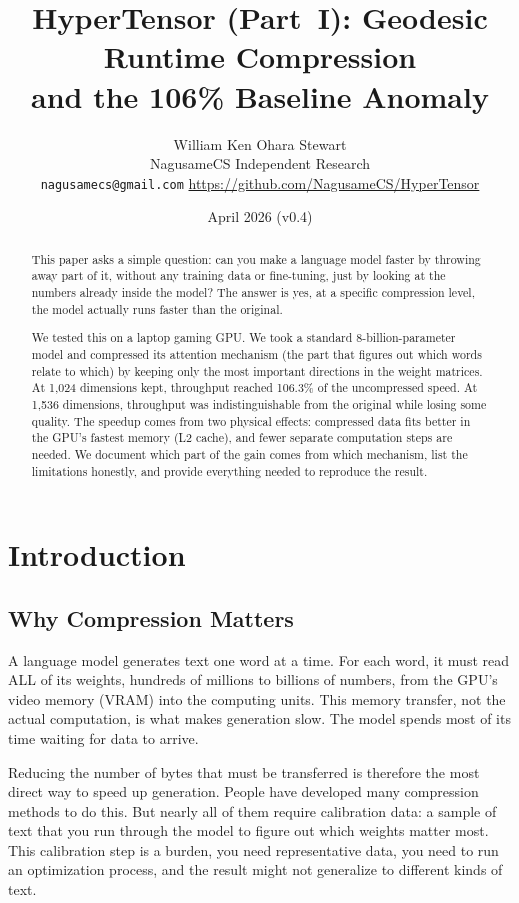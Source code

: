 \documentclass[11pt]{article}
\title{HyperTensor (Part~I): Geodesic Runtime Compression\\and the 106\% Baseline Anomaly}
\author{William Ken Ohara Stewart\\
\small NagusameCS Independent Research\\
\small \texttt{nagusamecs@gmail.com} \quad \url{https://github.com/NagusameCS/HyperTensor}}
\date{April 2026 (v0.4)}
\begin{document}
\maketitle
\hypertensorbanner

\begin{abstract}
\noindent
This paper asks a simple question: can you make a language model faster by
throwing away part of it, without any training data or fine-tuning, just by
looking at the numbers already inside the model? The answer is yes, at a
specific compression level, the model actually runs faster than the original.

We tested this on a laptop gaming GPU. We took a standard 8-billion-parameter
model and compressed its attention mechanism (the part that figures out which
words relate to which) by keeping only the most important directions in the
weight matrices. At 1,024 dimensions kept, throughput reached 106.3\% of the
uncompressed speed. At 1,536 dimensions, throughput was indistinguishable from
the original while losing some quality. The speedup comes from two physical
effects: compressed data fits better in the GPU's fastest memory (L2 cache),
and fewer separate computation steps are needed. We document which part of the
gain comes from which mechanism, list the limitations honestly, and provide
everything needed to reproduce the result.
\end{abstract}

\section{Introduction}
\label{sec:intro}

\subsection{Why Compression Matters}

A language model generates text one word at a time. For each word, it must
read ALL of its weights, hundreds of millions to billions of numbers, from
the GPU's video memory (VRAM) into the computing units. This memory transfer,
not the actual computation, is what makes generation slow. The model spends
most of its time waiting for data to arrive.

Reducing the number of bytes that must be transferred is therefore the most
direct way to speed up generation. People have developed many compression
methods to do this. But nearly all of them require calibration data: a sample
of text that you run through the model to figure out which weights matter most.
This calibration step is a burden, you need representative data, you need to
run an optimization process, and the result might not generalize to different
kinds of text.
\end{document}
